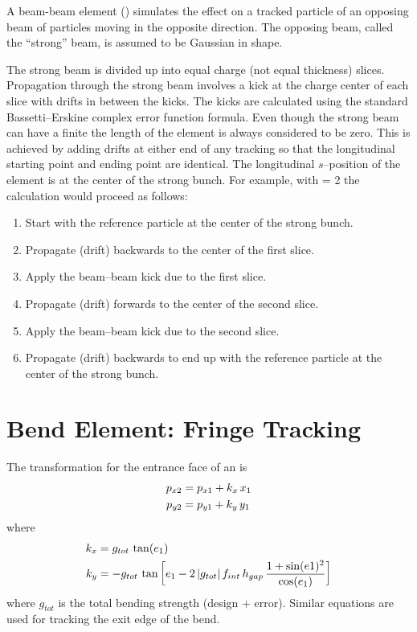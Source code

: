 A beam-beam element () simulates the effect on a tracked
particle of an opposing beam of particles moving in the opposite
direction. The opposing beam, called the ``strong'' beam, is assumed
to be Gaussian in shape.

The strong beam is divided up into  equal charge (not
equal thickness) slices. Propagation through the strong beam involves
a kick at the charge center of each slice with drifts in between the
kicks. The kicks are calculated using the standard Bassetti--Erskine
complex error function formula\cite{b:talman}.  Even though the strong
beam can have a finite  the length of the element is always
considered to be zero. This is achieved by adding drifts at either end
of any tracking so that the longitudinal starting point and ending
point are identical. The longitudinal $s$--position of the
 element is at the center of the strong bunch. For
example, with  = 2 the calculation would proceed as
follows:
\begin{enumerate}
  \item  Start with the reference particle at the center of the strong bunch.
  \item  Propagate (drift) backwards to the center of the first slice.
  \item  Apply the beam--beam kick due to the first slice.
  \item  Propagate (drift) forwards to the center of the second slice.
  \item  Apply the beam--beam kick due to the second slice.
  \item  Propagate (drift) backwards to end up with the reference particle
     at the center of the strong bunch.
\end{enumerate}

\section{Bend Element: Fringe Tracking}
\label{s:.bend.fringe.std}

The transformation for the entrance face of an  is
\begin{align}
  p_{x2} &= p_{x1} + k_x \, x_1 \nonumber \\
  p_{y2} &= p_{y1} + k_y \, y_1
\end{align}
where
\begin{align}
  k_x &= g_{tot} \, \tan(e_1) \nonumber \\
  k_y &= -g_{tot} \, \tan \left[ e_1 - 2 \, |g_{tot}| \, f_{int} \,  h_{gap} \, 
    \frac{1 + \sin(e1)^2}{\cos(e_1)} \right]
\end{align}
where $g_{tot}$ is the total bending strength (design +
error). Similar equations are used for tracking the exit edge of the
bend.

